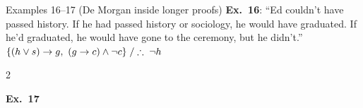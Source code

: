 \begin{nbexample}{Examples 16--17 (De Morgan inside longer proofs)}
\textbf{Ex.~16}: ``Ed couldn't have passed history. If he had passed history or sociology,
he would have graduated. If he'd graduated, he would have gone to the ceremony, but he
didn't.'' $\{(h \lor s) \rightarrow g,\ (g \rightarrow c) \land \neg c\} \;/\therefore\; \neg h$
\begin{multicols}{2}
\begin{fitchproof}
 \RPrem
{} \RPrem
{} 
 
 
 
 
 
\end{fitchproof}
\columnbreak
\textbf{Ex.~17}
\begin{fitchproof}
 \RPrem
{} \RPrem
\open
{} \RAss
{} 
 
 
 
\close
{} 
\end{fitchproof}
\end{multicols}
\end{nbexample}

